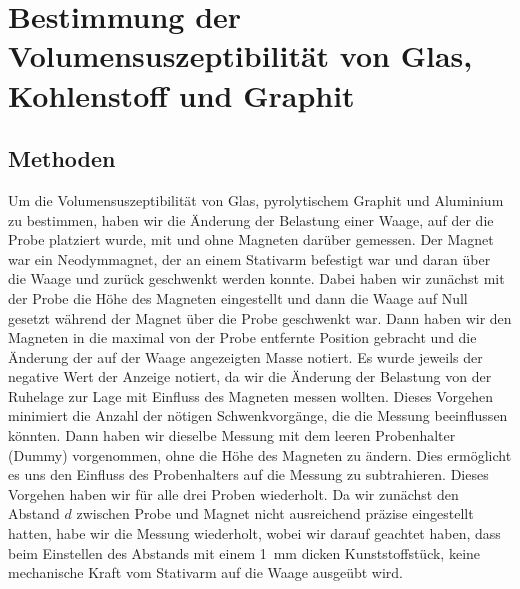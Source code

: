 \documentclass[
	a4paper,
	12pt,
	pagesize,
	ngerman
]{scrartcl}
\begin{document}
	\section{Bestimmung der Volumensuszeptibilität von Glas, Kohlenstoff und Graphit}
	\subsection{Methoden}
	Um die Volumensuszeptibilität von Glas, pyrolytischem Graphit und Aluminium zu bestimmen, haben wir die Änderung der Belastung einer Waage, auf der die Probe platziert wurde, mit und ohne Magneten darüber gemessen. Der Magnet war ein Neodymmagnet, der an einem Stativarm befestigt war und daran über die Waage und zurück geschwenkt werden konnte. Dabei haben wir zunächst mit der Probe die Höhe des Magneten eingestellt und dann die Waage auf Null gesetzt während der Magnet über die Probe geschwenkt war. Dann haben wir den Magneten in die maximal von der Probe entfernte Position gebracht und die Änderung der auf der Waage angezeigten Masse notiert. Es wurde jeweils der negative Wert der Anzeige notiert, da wir die Änderung der Belastung von der Ruhelage zur Lage mit Einfluss des Magneten messen wollten. Dieses Vorgehen minimiert die Anzahl der nötigen Schwenkvorgänge, die die Messung beeinflussen könnten. Dann haben wir dieselbe Messung mit dem leeren Probenhalter (Dummy) vorgenommen, ohne die Höhe des Magneten zu ändern. Dies ermöglicht es uns den Einfluss des Probenhalters auf die Messung zu subtrahieren. Dieses Vorgehen haben wir für alle drei Proben wiederholt. Da wir zunächst den Abstand $d$ zwischen Probe und Magnet nicht ausreichend präzise eingestellt hatten, habe wir die Messung wiederholt, wobei wir darauf geachtet haben, dass beim Einstellen des Abstands mit einem \SI{1}{\milli \meter} dicken Kunststoffstück, keine mechanische Kraft vom Stativarm auf die Waage ausgeübt wird. 
\end{document}
